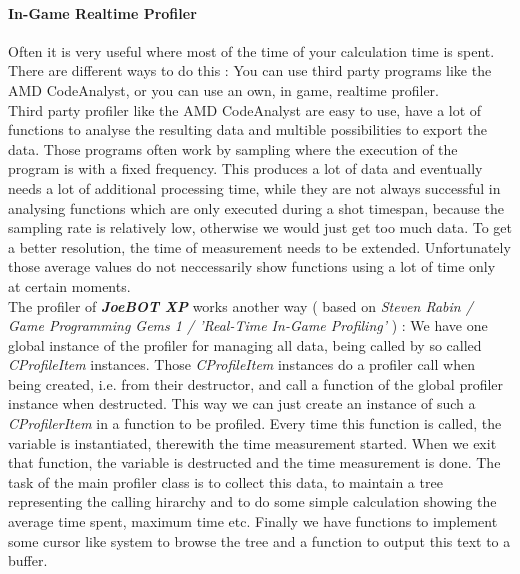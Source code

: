 \documentclass[12pt]{article}
\newcommand {\joebotxp}{\textit{\textbf{JoeBOT XP}} }
\begin{document}
\paragraph{In-Game Realtime Profiler}
Often it is very useful where most of the time of your calculation time is spent. There are different ways to do this : You can use third party programs like the AMD CodeAnalyst, or you can use an own, in game, realtime profiler.\\
Third party profiler like the AMD CodeAnalyst are easy to use, have a lot of functions to analyse the resulting data and multible possibilities to export the data. Those programs often work by sampling where the execution of the program is with a fixed frequency. This produces a lot of data and eventually needs a lot of additional processing time, while they are not always successful in analysing functions which are only executed during a shot timespan, because the sampling rate is relatively low, otherwise we would just get too much data. To get a better resolution, the time of measurement needs to be extended. Unfortunately those average values do not neccessarily show functions using a lot of time only at certain moments.\\
The profiler of \joebotxp works another way ( based on \textit{Steven Rabin / Game Programming Gems 1 / 'Real-Time In-Game Profiling'} ) : We have one global instance of the profiler for managing all data, being called by so called \textit{CProfileItem} instances. Those \textit{CProfileItem} instances do a profiler call when being created, i.e. from their destructor, and call a function of the global profiler instance when destructed. This way we can just create an instance of such a \textit{CProfilerItem} in a function to be profiled. Every time this function is called, the variable is instantiated, therewith the time measurement started. When we exit that function, the variable is destructed and the time measurement is done. The task of the main profiler class is to collect this data, to maintain a tree representing the calling hirarchy and to do some simple calculation showing the average time spent, maximum time etc. Finally we have functions to implement some cursor like system to browse the tree and a function to output this text to a buffer.
\end{document}
